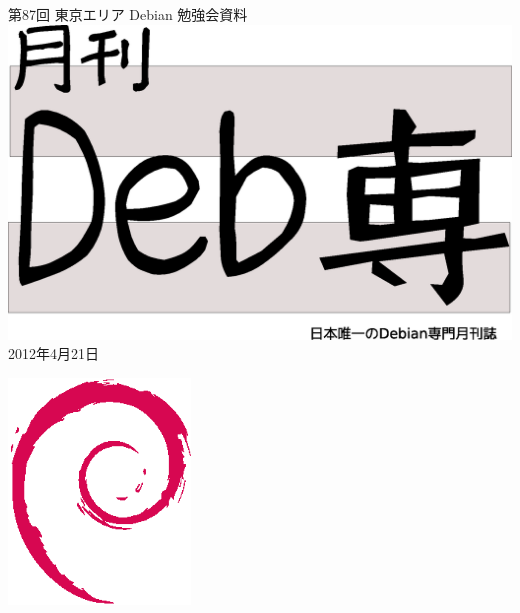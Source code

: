 \documentclass[mingoth,a4paper]{jsarticle}
\newcommand{\debmtgyear}{2012}
\newcommand{\debmtgmonth}{4}
\newcommand{\debmtgdate}{21}
\newcommand{\debmtgnumber}{87}
\begin{document}
\begin{titlepage}
\thispagestyle{empty}

\vspace*{-2cm}
第\debmtgnumber{}回 東京エリア Debian 勉強会資料\\
\hspace*{-2cm}
\includegraphics[width=210mm]{image201003/debsen.eps}\\
\hfill{}\debmtgyear{}年\debmtgmonth{}月\debmtgdate{}日

\vspace*{-2cm}
\vspace*{-2cm}

\vspace*{-2cm}
\hfill{}\includegraphics[height=6cm]{image200502/openlogo-nd.eps}
\end{titlepage}
\end{document}
